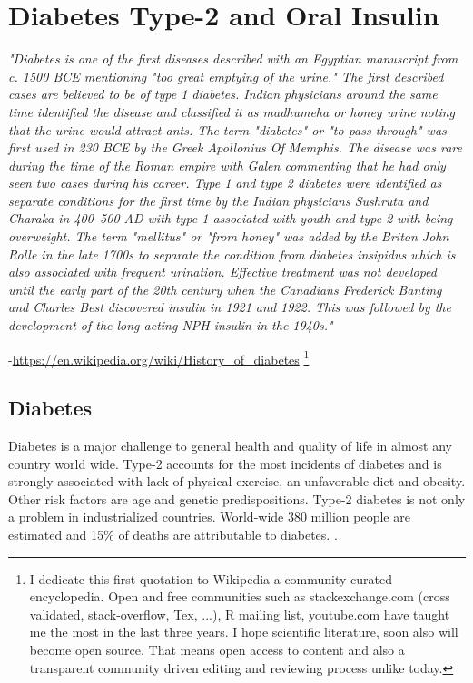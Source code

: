 \chapter{Diabetes Type-2 and Oral Insulin}


\textit{"Diabetes is one of the first diseases described with an Egyptian manuscript from c. 1500 BCE mentioning "too great emptying of the urine." The first described cases are believed to be of type 1 diabetes. Indian physicians around the same time identified the disease and classified it as madhumeha or honey urine noting that the urine would attract ants. The term "diabetes" or "to pass through" was first used in 230 BCE by the Greek Apollonius Of Memphis. The disease was rare during the time of the Roman empire with Galen commenting that he had only seen two cases during his career. Type 1 and type 2 diabetes were identified as separate conditions for the first time by the Indian physicians Sushruta and Charaka in 400–500 AD with type 1 associated with youth and type 2 with being overweight. The term "mellitus" or "from honey" was added by the Briton John Rolle in the late 1700s to separate the condition from diabetes insipidus which is also associated with frequent urination. Effective treatment was not developed until the early part of the 20th century when the Canadians Frederick Banting and Charles Best discovered insulin in 1921 and 1922. This was followed by the development of the long acting NPH insulin in the 1940s."}

-\url{https://en.wikipedia.org/wiki/History_of_diabetes} \footnote{I dedicate this first quotation to Wikipedia a community curated encyclopedia. Open and free communities such as stackexchange.com (cross validated, stack-overflow, Tex, ...), R mailing list, youtube.com have taught me the most in the last three years. I hope scientific literature, soon also will become open source. That means open access to content and also a transparent community driven editing and reviewing process unlike today.}
\newpage

\section{Diabetes}
Diabetes is a major challenge to general health and quality of life in almost any country world wide. Type-2 accounts for the most incidents of diabetes and is strongly associated with lack of physical exercise, an unfavorable diet and obesity. Other risk factors are age and genetic predispositions. Type-2 diabetes is not only a problem in industrialized countries.  World-wide 380 million people are estimated and 15\% of deaths are attributable to diabetes. \cite{aguiree2013idf}.



